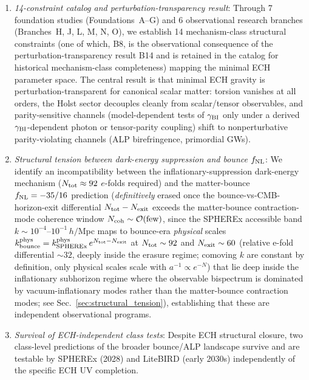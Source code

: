 \documentclass[aps,prd,twocolumn,superscriptaddress,showpacs,preprintnumbers,nofootinbib,longbibliography,floatfix]{revtex4-2}
\newcommand{\fnl}{f_{\rm NL}}
\begin{document}
\begin{enumerate}[leftmargin=*]
\item \textit{14-constraint catalog and perturbation-transparency result}:
Through 7 foundation studies (Foundations~A--G) and 6 observational research branches (Branches~H, J, L, M, N, O), we establish 14 mechanism-class
structural constraints (one of which, B8, is the observational consequence of
the perturbation-transparency result B14 and is retained in the catalog for
historical mechanism-class completeness) mapping the minimal ECH parameter space. The central result
is that minimal ECH gravity is perturbation-transparent for canonical scalar
matter: torsion vanishes at all orders, the Holst sector decouples cleanly
from scalar/tensor observables, and parity-sensitive channels (model-dependent
tests of $\gamma_{\rm BI}$ only under a derived $\gamma_{\rm BI}$-dependent
photon or tensor-parity coupling) shift to nonperturbative parity-violating
channels (ALP birefringence, primordial GWs).

\item \textit{Structural tension between dark-energy suppression and bounce $\fnl$}:
We identify an incompatibility between the inflationary-suppression dark-energy
mechanism ($N_{\rm tot}\approx 92$ $e$-folds required) and the matter-bounce
$\fnl=-35/16$ prediction (\emph{definitively} erased once the bounce-vs-CMB-horizon-exit differential $N_{\rm tot}-N_{\rm exit}$ exceeds the matter-bounce contraction-mode coherence window $N_{\rm coh}\sim\mathcal{O}(\text{few})$, since the SPHEREx accessible band $k\sim 10^{-4}$--$10^{-1}\,h/$Mpc maps to bounce-era \emph{physical} scales $k_{\rm bounce}^{\rm phys} = k_{\rm SPHEREx}^{\rm phys}\,e^{N_{\rm tot}-N_{\rm exit}}$ at $N_{\rm tot}\sim 92$ and $N_{\rm exit}\sim 60$ (relative e-fold differential $\sim 32$, deeply inside the erasure regime; comoving $k$ are constant by definition, only physical scales scale with $a^{-1}\propto e^{-N}$) that lie deep inside the inflationary subhorizon regime where the observable bispectrum is dominated by vacuum-inflationary modes rather than the matter-bounce contraction modes; see Sec.~\ref{sec:structural_tension}), establishing that
these are independent observational programs.

\item \textit{Survival of ECH-independent class tests}: Despite ECH structural
closure, two class-level predictions of the broader bounce/ALP landscape
survive and are testable by SPHEREx (2028) and LiteBIRD (early 2030s)
independently of the specific ECH UV completion.
\end{enumerate}
\end{document}
